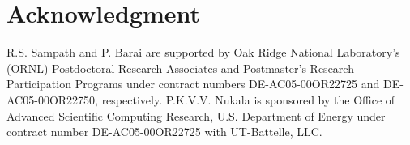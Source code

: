 \documentclass[11pt]{iopart}
\begin{document}
  
\section{Acknowledgment} 
R.S. Sampath and P. Barai are supported by Oak Ridge National Laboratory's (ORNL) Postdoctoral Research Associates and Postmaster's Research Participation Programs under contract numbers DE-AC05-00OR22725 and DE-AC05-00OR22750, respectively. 
P.K.V.V. Nukala is sponsored by the Office 
of Advanced Scientific Computing Research, U.S. Department of Energy under contract number DE-AC05-00OR22725 with UT-Battelle, LLC. 

\small
 

\end{document}
